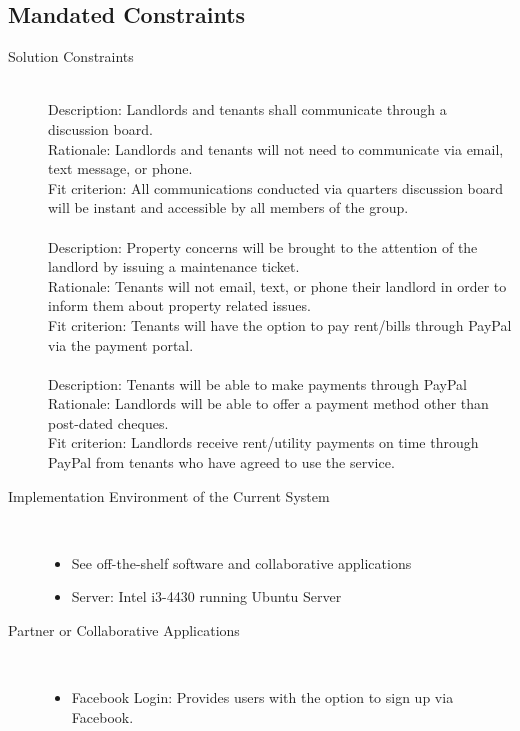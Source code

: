 \documentclass[12pt, titlepage]{article}
\begin{document}
\subsection{Mandated Constraints} %
\begin{description}
  \item[Solution Constraints] \hfill \\
    Description: Landlords and tenants shall communicate through a discussion
    board. \\
    Rationale: Landlords and tenants will not need to communicate via email,
    text message, or phone. \\
    Fit criterion: All communications conducted via quarters discussion
    board will be instant and accessible by all members of the group. \\
    \\
    Description: Property concerns will be brought to the attention of the
    landlord by issuing a maintenance ticket. \\
    Rationale: Tenants will not email, text, or phone their landlord in order
    to inform them about property related issues. \\
    Fit criterion: Tenants will have the option to pay rent/bills through
    PayPal via the payment portal. \\
    \\
    Description: Tenants will be able to make payments through PayPal
    Rationale: Landlords will be able to offer a payment method other than
    post-dated cheques. \\
    Fit criterion: Landlords receive rent/utility payments on time through
    PayPal from tenants who have agreed to use the service. \\
  \item[Implementation Environment of the Current System] \hfill \\
    \begin{itemize}
      \item See off-the-shelf software and collaborative applications
      \item Server: Intel i3-4430 running Ubuntu Server
    \end{itemize}
  \item[Partner or Collaborative Applications] \hfil \\
    \begin{itemize}
    \item Facebook Login: Provides users with the option to sign up via Facebook.

\end{itemize}
\end{description}
\end{document}
